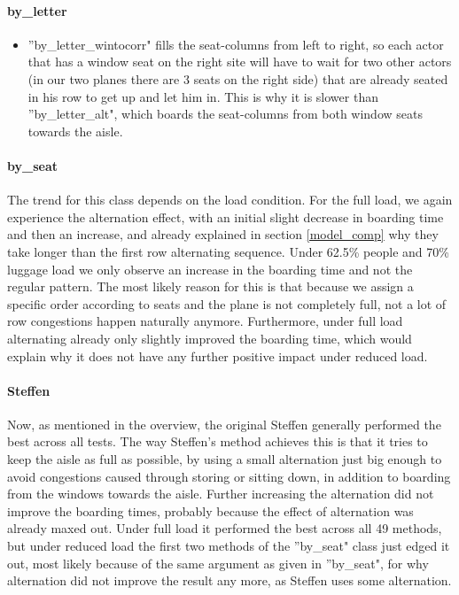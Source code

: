 \documentclass[11pt]{article}
\begin{document}
 \paragraph{by\_letter}
 \begin{itemize}
 	\item ''by\_letter\_wintocorr" fills the seat-columns from left to right, so each actor that has a window seat on the right site will have to wait for two other actors (in our two planes there are 3 seats on the right side) that are already seated in his row to get up and let him in. This is why it is slower than ''by\_letter\_alt", which boards the seat-columns from both window seats towards the aisle.
 \end{itemize}
 
 \paragraph{by\_seat}
 The trend for this class depends on the load condition. For the full load, we again experience the alternation effect, with an initial slight decrease in boarding time and then an increase, and already explained in section \ref{model_comp} why they take longer than the first row alternating sequence. Under 62.5\% people and 70\% luggage load we only observe an increase in the boarding time and not the regular pattern. The most likely reason for this is that because we assign a specific order according to seats and the plane is not completely full, not a lot of row congestions happen naturally anymore. Furthermore, under full load alternating already only slightly improved the boarding time, which would explain why it does not have any further positive impact under reduced load. 
 
 \paragraph{Steffen}
 Now, as mentioned in the overview, the original Steffen generally performed the best across all tests. The way Steffen's method achieves this is that it tries to keep the aisle as full as possible, by using a small alternation just big enough to avoid congestions caused through storing or sitting down, in addition to boarding from the windows towards the aisle. Further increasing the alternation did not improve the boarding times, probably because the effect of alternation was already maxed out. Under full load it performed the best across all 49 methods, but under reduced load the first two methods of the ''by\_seat" class just edged it out, most likely because of the same argument as given in ''by\_seat", for why alternation did not improve the result any more, as Steffen uses some alternation. 
 
\end{document}
